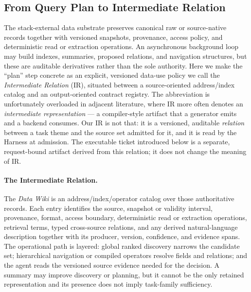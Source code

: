 \documentclass[11pt]{article}
\begin{document}
\subsection{From Query Plan to Intermediate Relation}
\label{sec:intermediate-relation}

The stack-external data substrate preserves canonical raw or source-native records together with versioned snapshots, provenance, access policy, and deterministic read or extraction operations. An asynchronous background loop may build indexes, summaries, proposed relations, and navigation structures, but these are auditable derivatives rather than the sole authority. Here we make the ``plan'' step concrete as an explicit, versioned data-use policy we call the \textit{Intermediate Relation} (IR), situated between a source-oriented address/index catalog and an output-oriented contract registry. The abbreviation is unfortunately overloaded in adjacent literature, where IR more often denotes an \textit{intermediate representation} --- a compiler-style artifact that a generator emits and a backend consumes. Our IR is not that: it is a versioned, auditable \textit{relation} between a task theme and the source set admitted for it, and it is read by the Harness at admission. The executable ticket introduced below is a separate, request-bound artifact derived from this relation; it does not change the meaning of IR.

\paragraph{The Intermediate Relation.}
The \textit{Data Wiki} is an address/index/operator catalog over those authoritative records. Each entry identifies the source, snapshot or validity interval, provenance, format, access boundary, deterministic read or extraction operations, retrieval terms, typed cross-source relations, and any derived natural-language description together with its producer, version, confidence, and evidence spans. The operational path is layered: global ranked discovery narrows the candidate set; hierarchical navigation or compiled operators resolve fields and relations; and the agent reads the versioned source evidence needed for the decision. A summary may improve discovery or planning, but it cannot be the only retained representation and its presence does not imply task-family sufficiency.
\end{document}
